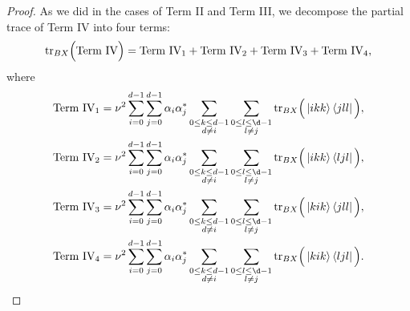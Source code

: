 \documentclass[reqno]{amsart}
\numberwithin{lemma}{section}
\numberwithin{proposition}{section}
\newcommand{\tr}{\textnormal{tr}}
\begin{document}
{\begin{proof}
As we did in the cases of Term II and Term III, we decompose the partial trace of Term IV into four terms:
\begin{equation*}
\tr_{BX} \Big ( \text{Term IV} \Big ) = \text{Term IV}_{1} + \text{Term IV}_{2} + \text{Term IV}_{3} + \text{Term IV}_{4}, 
\end{equation*}
where
\begin{align*}
\text{Term IV}_{1} & = \nu^{2} \sum_{i=0}^{d-1} \sum_{j=0}^{d-1} \alpha_{i} \alpha_{j}^{*} \sum_{\substack{0 \leq k \leq d-1\\ d \neq i}} \sum_{\substack{0 \leq l \leq \d-1\\ l \neq j}} \tr_{BX} \Big ( \ket{ikk}\bra{jll} \Big ), \\
\text{Term IV}_{2} & = \nu^{2} \sum_{i=0}^{d-1} \sum_{j=0}^{d-1} \alpha_{i} \alpha_{j}^{*} \sum_{\substack{0 \leq k \leq d-1\\ d \neq i}} \sum_{\substack{0 \leq l \leq \d-1\\ l \neq j}} \tr_{BX} \Big ( \ket{ikk}\bra{ljl} \Big ),\\
\text{Term IV}_{3} & = \nu^{2} \sum_{i=0}^{d-1} \sum_{j=0}^{d-1} \alpha_{i} \alpha_{j}^{*} \sum_{\substack{0 \leq k \leq d-1\\ d \neq i}} \sum_{\substack{0 \leq l \leq \d-1\\ l \neq j}} \tr_{BX} \Big ( \ket{kik}\bra{jll} \Big ),\\
\text{Term IV}_{4} & = \nu^{2} \sum_{i=0}^{d-1} \sum_{j=0}^{d-1} \alpha_{i} \alpha_{j}^{*} \sum_{\substack{0 \leq k \leq d-1\\ d \neq i}} \sum_{\substack{0 \leq l \leq \d-1\\ l \neq j}} \tr_{BX} \Big ( \ket{kik}\bra{ljl} \Big ).
\end{align*}

\smallskip


\end{proof}}
\end{document}
